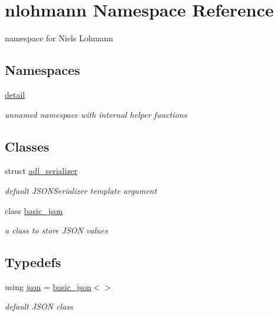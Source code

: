\hypertarget{namespacenlohmann}{}\section{nlohmann Namespace Reference}
\label{namespacenlohmann}


namespace for Niels Lohmann  


\subsection*{Namespaces}
\begin{DoxyCompactItemize}
\item 
 \hyperlink{namespacenlohmann_1_1detail}{detail}
\begin{DoxyCompactList}\small\item\em unnamed namespace with internal helper functions \end{DoxyCompactList}\end{DoxyCompactItemize}
\subsection*{Classes}
\begin{DoxyCompactItemize}
\item 
struct \hyperlink{structnlohmann_1_1adl__serializer}{adl\+\_\+serializer}
\begin{DoxyCompactList}\small\item\em default J\+S\+O\+N\+Serializer template argument \end{DoxyCompactList}\item 
class \hyperlink{classnlohmann_1_1basic__json}{basic\+\_\+json}
\begin{DoxyCompactList}\small\item\em a class to store J\+S\+ON values \end{DoxyCompactList}\end{DoxyCompactItemize}
\subsection*{Typedefs}
\begin{DoxyCompactItemize}
\item 
using \hyperlink{namespacenlohmann_a2bfd99e845a2e5cd90aeaf1b1431f474}{json} = \hyperlink{classnlohmann_1_1basic__json}{basic\+\_\+json}$<$$>$
\begin{DoxyCompactList}\small\item\em default J\+S\+ON class \end{DoxyCompactList}\end{DoxyCompactItemize}



